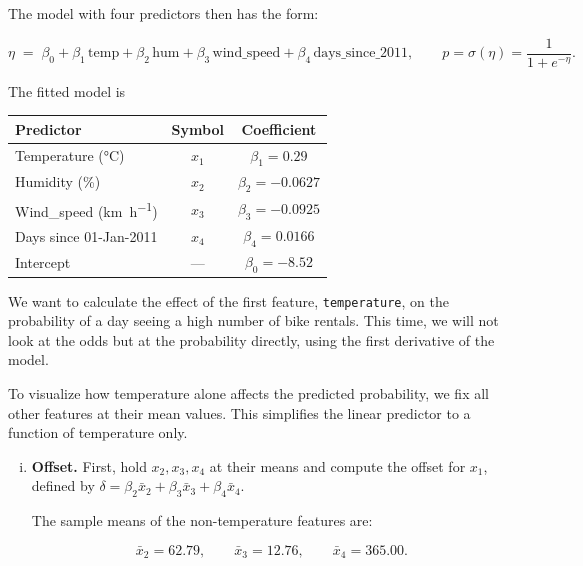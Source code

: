 {\begin{enumerate}[a)]
    The model with four predictors then has the form:
    
    \[
    \eta  \;=\;
    \beta_0
    + \beta_1\,\text{temp}
    + \beta_2\,\text{hum}
    + \beta_3\,\text{wind\_speed}
    + \beta_4\,\text{days\_since\_2011},
    \qquad
    p=\sigma(\eta)=\frac{1}{1+e^{-\eta}} .
    \]

    The fitted model is
    
    \begin{center}
    \begin{tabular}{lcc}
        \toprule
            Predictor & Symbol & Coefficient \\
        \midrule
            Temperature (\si{\celsius})            & \(x_1\) & \(\beta_1 =  0.29\) \\
            Humidity (\si{\percent})               & \(x_2\) & \(\beta_2 = -0.0627\) \\
            Wind\_speed (\si{\kilo\metre\per\hour})  & \(x_3\) & \(\beta_3 = -0.0925\) \\
            Days since 01-Jan-2011                 & \(x_4\) & \(\beta_4 =  0.0166\) \\
        \midrule
            Intercept                              & —       & \(\beta_0 = -8.52\) \\
        \bottomrule
    \end{tabular}
    \end{center}

    We want to calculate the effect of the first feature, \texttt{temperature}, on the probability of a day seeing a high number of bike rentals. 
    This time, we will not look at the odds but at the probability directly, using the first derivative of the model.
    
    To visualize how temperature alone affects the predicted probability, we fix all other features at their mean values. This simplifies the linear predictor to a function of temperature only.

    \begin{enumerate}[(i)]

        \item\textbf{Offset.}
        First, hold \(x_2,x_3,x_4\) at their means and compute the offset for \(x_1\), defined by
        \(\displaystyle \delta = \beta_2\bar{x}_2+\beta_3\bar{x}_3+\beta_4\bar{x}_4\).

        The sample means of the non-temperature features are:
    
        \[
        \bar{x}_2 = 62.79,\qquad
        \bar{x}_3 = 12.76,\qquad
        \bar{x}_4 = 365.00.
        \]
    

\end{enumerate}
\end{enumerate}}
